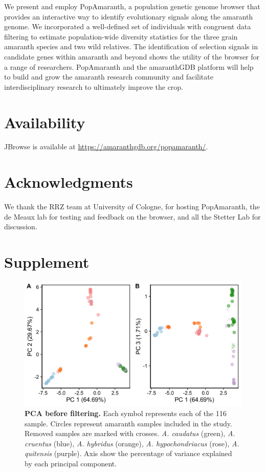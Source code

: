 \documentclass[9pt,twocolumn,twoside]{celabRxiv}
\newcommand{\beginsupplement}{%
 \setcounter{table}{0}
 \renewcommand{\thetable}{S\arabic{table}}%
 \setcounter{figure}{0}
 \renewcommand{\thefigure}{S\arabic{figure}}%
 }
\begin{document}
We present and employ PopAmaranth, a population genetic genome browser that provides an interactive way to identify evolutionary signals along the amaranth genome.
We incorporated a well-defined set of individuals with congruent data filtering to estimate population-wide diversity statistics for the three grain amaranth species and two wild relatives. 
The identification of selection signals in candidate genes within amaranth and beyond shows the utility of the browser for a range of researchers.
PopAmaranth and the amaranthGDB platform will help to build and grow the amaranth research community and facilitate interdisciplinary research to ultimately improve the crop.

\section{Availability}

JBrowse is available at \url{https://amaranthgdb.org/popamaranth/}.



\section{Acknowledgments}
We thank the RRZ team at University of Cologne, for hosting PopAmaranth, the de Meaux lab for testing and feedback on the browser, and all the Stetter Lab for discussion. 

 



\onecolumn
\section*{Supplement}


 
\beginsupplement

\begin{figure}[ht]
\includegraphics[width=1\linewidth]{figures/pca_plots_all_samples.png}
\caption{\textbf{PCA before filtering.} Each symbol represents each of the 116 sample. Circles represent amaranth samples included in the study. Removed samples are marked with crosses. \textit{A. caudatus} (green), \textit{A. cruentus} (blue), \textit{A. hybridus} (orange), \textit{A. hypochondriacus} (rose), \textit{A. quitensis} (purple). Axis show the percentage of variance explained by each principal component.}
\label{fig:pca_sup}
\end{figure}
\end{document}
